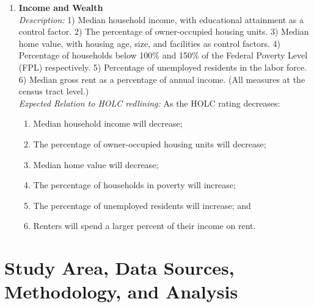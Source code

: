\documentclass[paper=letter, fontsize=12pt]{scrartcl} %
\begin{document}
\begin{enumerate}
	\item \textbf{Income and Wealth}\\
	\textit{Description:} 1) Median household income, with educational attainment as a control factor. 2) The percentage of owner-occupied housing units. 3) Median home value, with housing age, size, and facilities as control factors. 4) Percentage of households below 100\% and 150\% of the Federal Poverty Level (FPL) respectively. 5) Percentage of unemployed residents in the labor force. 6) Median gross rent as a percentage of annual income. (All measures at the census tract level.)\\
	\textit{Expected Relation to HOLC redlining:} As the HOLC rating decreases:
	\begin{enumerate}
		\item Median household income will decrease;
		\item The percentage of owner-occupied housing units will decrease;
		\item Median home value will decrease;
		\item The percentage of households in poverty will increase;
		\item The percentage of unemployed residents will increase; and
		\item Renters will spend a larger percent of their income on rent.
	\end{enumerate}
\end{enumerate}

\section{Study Area, Data Sources, Methodology, and Analysis}
\end{document}
